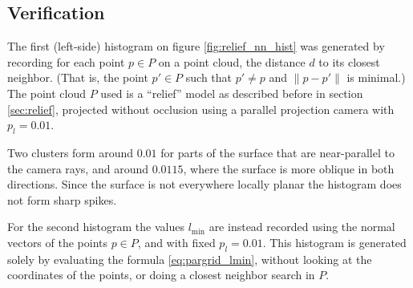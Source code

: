 \subsection{Verification}
The first (left-side) histogram on figure \ref{fig:relief_nn_hist} was generated by recording for each point $p \in P$ on a point cloud, the distance $d$ to its closest neighbor. (That is, the point $p' \in P$ such that $p' \neq p$ and $\| p - p' \|$ is minimal.) The point cloud $P$ used is a ``relief'' model as described before in section \ref{sec:relief}, projected without occlusion using a parallel projection camera with $p_l = 0.01$.

Two clusters form around $0.01$ for parts of the surface that are near-parallel to the camera rays, and around $0.0115$, where the surface is more oblique in both directions. Since the surface is not everywhere locally planar the histogram does not form sharp spikes.

For the second histogram the values $l_{\text{min}}$ are instead recorded using the normal vectors of the points $p \in P$, and with fixed $p_l = 0.01$. This histogram is generated solely by evaluating the formula \ref{eq:pargrid_lmin}, without looking at the coordinates of the points, or doing a closest neighbor search in $P$.

